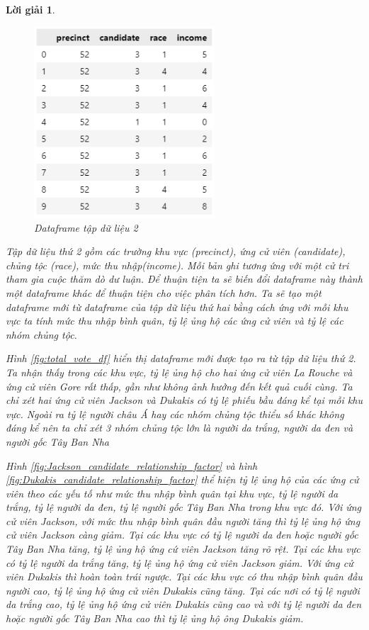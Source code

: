 \documentclass[14pt, a4paper]{article}
\theoremstyle{sltheorem}
\theoremstyle{soltheorem}
\newtheorem*{loigiai}{Lời giải}
\begin{document}
\begin{loigiai}
\begin{enumerate}
    \begin{figure}[H]
        \centering
        \includegraphics[width=0.6\textwidth]{figures/vote_df.png}
        \caption{Dataframe tập dữ liệu 2}
        \label{fig:vote_df}
    \end{figure}

    Tập dữ liệu thứ 2 gồm các trường khu vực (precinct), ứng cử viên (candidate), chủng tộc (race), mức thu nhập(income).
    Mỗi bản ghi tương ứng với một cử tri tham gia cuộc thăm dò dư luận.
    Để thuận tiện ta sẽ biến đổi dataframe này thành một dataframe khác để thuận tiện cho việc phân tích hơn.
    Ta sẽ tạo một dataframe mới từ dataframe của tập dữ liệu thứ hai bằng cách ứng với mỗi khu vực ta tính mức thu nhập bình quân, tỷ lệ ủng hộ các ứng cử viên và tỷ lệ các nhóm chủng tộc.

    Hình \ref{fig:total_vote_df} hiển thị dataframe mới được tạo ra từ tập dữ liệu thứ 2.
    Ta nhận thấy trong các khu vực, tỷ lệ ủng hộ cho hai ứng cử viên La Rouche và ứng cử viên Gore rất thấp, gần như không ảnh hưởng đến kết quả cuối cùng.
    Ta chỉ xét hai ứng cử viên Jackson và Dukakis có tỷ lệ phiếu bầu đáng kể tại mỗi khu vực.
    Ngoài ra tỷ lệ người châu Á hay các nhóm chủng tộc thiểu số khác không đáng kể nên ta chỉ xét 3 nhóm chủng tộc lớn là người da trắng, người da đen và người gốc Tây Ban Nha
    
    Hình \ref{fig:Jackson_candidate_relationship_factor} và hình \ref{fig:Dukakis_candidate_relationship_factor} thể hiện tỷ lệ ủng hộ của các ứng cử viên theo các yếu tố như mức thu nhập bình quân tại khu vực, tỷ lệ người da trắng, tỷ lệ người da đen, tỷ lệ người gốc Tây Ban Nha trong khu vực đó.
    Với ứng cử viên Jackson, với mức thu nhập bình quân đầu người tăng thì tỷ lệ ủng hộ ứng cử viên Jackson càng giảm.
    Tại các khu vực có tỷ lệ người da đen hoặc người gốc Tây Ban Nha tăng, tỷ lệ ủng hộ ứng cứ viên Jackson tăng rõ rệt.
    Tại các khu vực có tỷ lệ người da trắng tăng, tỷ lệ ủng hộ ứng cử viên Jackson giảm.
    Với ứng cử viên Dukakis thì hoàn toàn trái ngược. Tại các khu vực có thu nhập bình quân đầu người cao, tỷ lệ ủng hộ ứng cử viên Dukakis cũng tăng.
    Tại các nơi có tỷ lệ người da trắng cao, tỷ lệ ủng hộ ứng cử viên Dukakis cũng cao và với tỷ lệ người da đen hoặc người gốc Tây Ban Nha cao thì tỷ lệ ủng hộ ông Dukakis giảm.


\end{enumerate}
\end{loigiai}
\end{document}
